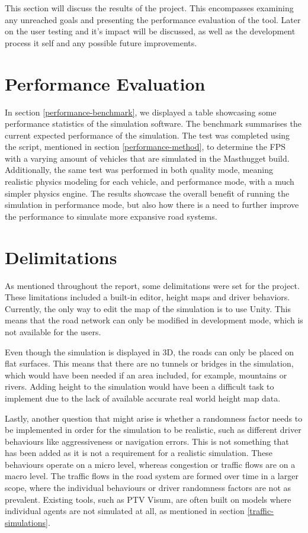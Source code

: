 
This section will discuss the results of the project. This encompasses examining any unreached goals and presenting the performance evaluation of the tool. Later on the user testing and it's impact will be discussed, as well as the development process it self and any possible future improvements.

\section{Performance Evaluation}
    In section \ref{performance-benchmark}, we displayed a table showcasing some performance statistics of the simulation software. The benchmark summarises the current expected performance of the simulation. The test was completed using the script, mentioned in section \ref{performance-method}, to determine the FPS with a varying amount of vehicles that are simulated in the Masthugget build. Additionally, the same test was performed in both quality mode, meaning realistic physics modeling for each vehicle, and performance mode, with a much simpler physics engine. The results showcase the overall benefit of running the simulation in performance mode, but also how there is a need to further improve the performance to simulate more expansive road systems.

\section{Delimitations}
    As mentioned throughout the report, some delimitations were set for the project. These limitations included a built-in editor, height maps and driver behaviors. Currently, the only way to edit the map of the simulation is to use Unity. This means that the road network can only be modified in development mode, which is not available for the users.

    Even though the simulation is displayed in 3D, the roads can only be placed on flat surfaces. This means that there are no tunnels or bridges in the simulation, which would have been needed if an area included, for example, mountains or rivers. Adding height to the simulation would have been a difficult task to implement due to the lack of available accurate real world height map data.

    Lastly, another question that might arise is whether a randomness factor needs to be implemented in order for the simulation to be realistic, such as different driver behaviours like aggressiveness or navigation errors. This is not something that has been added as it is not a requirement for a realistic simulation. These behaviours operate on a micro level, whereas congestion or traffic flows are on a macro level. The traffic flows in the road system are formed over time in a larger scope, where the individual behaviours or driver randomness factors are not as prevalent. Existing tools, such as PTV Visum, are often built on models where individual agents are not simulated at all, as mentioned in section \ref{traffic-simulations}.

